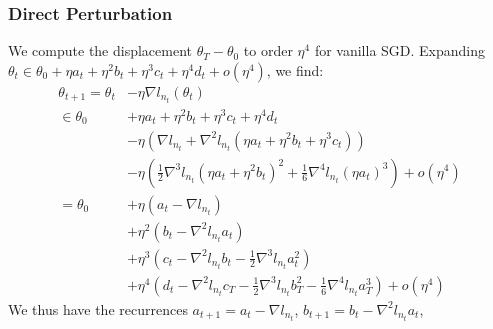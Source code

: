 \documentclass{article}
\theoremstyle{plain}
\theoremstyle{definition}
\newcommand{\wrap}[1]{\left(#1\right)}
\begin{document}
        \subsubsection*{Direct Perturbation}
            We compute the displacement $\theta_T-\theta_0$ to order $\eta^4$ 
            for vanilla SGD.  Expanding
            $
                \theta_t \in \theta_0
                    + \eta a_t + \eta^2 b_t + \eta^3 c_t + \eta^4 d_t 
                    + o(\eta^4)
            $, we find:
            \begin{align*}
                \theta_{t+1}
                =
                \theta_t    &- \eta \nabla l_{n_t} (\theta_t) \\
                \in\theta_0 &+ \eta a_t + \eta^2 b_t + \eta^3 c_t + \eta^4 d_t \\
                            &- \eta \wrap{
                                    \nabla l_{n_t}
                                   +\nabla^2 l_{n_t}             (\eta a_t + \eta^2 b_t + \eta^3 c_t)
                               } \\
                            &- \eta \wrap{
                                    \frac{1}{2} \nabla^3 l_{n_t} (\eta a_t + \eta^2 b_t)^2
                                   +\frac{1}{6} \nabla^4 l_{n_t} (\eta a_t)^3
                               }
                             + o(\eta^4) \\
                =
                \theta_0    &+ \eta   \wrap{a_t - \nabla l_{n_t}} \\
                            &+ \eta^2 \wrap{b_t - \nabla^2 l_{n_t} a_t} \\ 
                            &+ \eta^3 \wrap{
                                   c_t
                                  -\nabla^2 l_{n_t} b_t
                                  -\frac{1}{2} \nabla^3 l_{n_t} a_t^2
                               } \\
                            &+ \eta^4 \wrap{
                                   d_t
                                  -            \nabla^2 l_{n_t} c_T
                                  -\frac{1}{2} \nabla^3 l_{n_t} b_T^2 
                                  -\frac{1}{6} \nabla^4 l_{n_t} a_T^3 
                               }
                             + o(\eta^4)
            \end{align*}
            We thus have the recurrences
            $
                a_{t+1} = a_t - \nabla l_{n_t}
            $,
            $
                b_{t+1} = b_t - \nabla^2 l_{n_t} a_t
            $,
\end{document}
